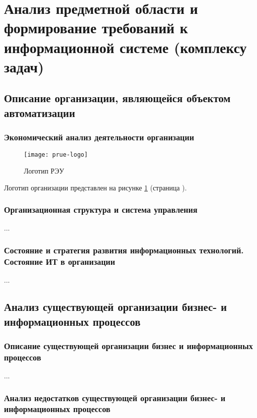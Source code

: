 \documentclass[../thesis.tex]{subfiles}
\begin{document}
\section{Анализ предметной области и формирование требований к информационной системе (комплексу задач)}
\subsection{Описание организации, являющейся объектом автоматизации}
\subsubsection{Экономический анализ деятельности организации}

\begin{figure}[h!]
    \centering
    \texttt{[image: prue-logo]}
    \caption{Логотип РЭУ }
    \label{fig:prue:logo}
\end{figure}

Логотип организации представлен на рисунке \ref{fig:prue:logo} (страница \pageref{fig:prue:logo}).

\subsubsection{Организационная структура и система управления}

...

\subsubsection{Состояние и стратегия развития информационных технологий. Состояние ИТ в организации}

...



\subsection{Анализ существующей организации бизнес- и информационных процессов}
\subsubsection{Описание существующей организации бизнес и информационных процессов}

...

\subsubsection{Анализ недостатков существующей организации бизнес- и информационных процессов}
\end{document}
